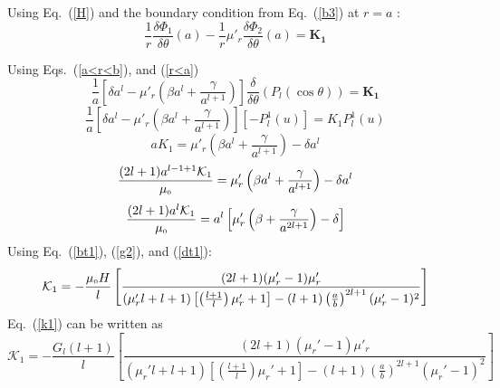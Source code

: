 Using Eq.~(\ref{H}) and the boundary condition from Eq.~(\ref{b3}) at $r=a$ :
$$\frac{1}{r}\frac{\delta \Phi_1}{\delta \theta}(a)-\frac{1}{r}\mu'_r\frac{\delta \Phi_2}{\delta \theta}(a)=\bm{K_1}  $$

Using Eqs.~(\ref{a<r<b}), and (\ref{r<a})
$$\frac{1}{a}\left[\delta a^l-\mu'_r\left(\beta a^l+\frac{\gamma}{a^{l+1}}\right)\right]\frac{\delta}{\delta \theta}(P_l(\cos\theta))= \bm{K_1}$$
$$\frac{1}{a}\left[\delta a^l-\mu'_r\left(\beta a^l+\frac{\gamma}{a^{l+1}}\right)\right][-P_l^1(u)]= K_1 P_l^1(u)$$
$$a K_1=\mu'_r\left(\beta a^l+\frac{\gamma}{a^{l+1}}\right)-\delta a^l$$
$$\frac{(2l+1)a^{l-1+1}\mathcal{K}_1}{\mu_{\scriptscriptstyle 0}}=\mu'_r\left(\beta a^l+\frac{\gamma}{a^{l+1}}\right)-\delta a^l$$
$$\frac{(2l+1)a^l\mathcal{K}_1}{\mu_{\scriptscriptstyle 0}}=a^l\left[\mu'_r\left(\beta +\frac{\gamma}{a^{2l+1}}\right)-\delta \right]$$
Using Eq.~(\ref{bt1}), (\ref{g2}), and (\ref{dt1}):
\begin{equation}\label{k1s}
\mathcal{K}_1=-\frac{\mu_{\scriptscriptstyle 0} H}{l}\left[\frac{(2l+1)(\mu_r'-1)\mu'_r}{(\mu_r'l+l+1)\left[\left(\frac{l+1}{l}\right)\mu_r'+1\right]-(l+1)\left(\frac{a}{b}\right)^{2l+1}(\mu_r'-1)^2}\right]
\end{equation}
Eq.~(\ref{k1}) can be written as
\begin{equation}\label{k1b}
\mathcal{K}_1=-\frac{G_l (l+1)}{l}\left[\frac{(2l+1)(\mu_r'-1)\mu'_r}{(\mu_r'l+l+1)\left[\left(\frac{l+1}{l}\right)\mu_r'+1\right]-(l+1)\left(\frac{a}{b}\right)^{2l+1}(\mu_r'-1)^2}\right]
\end{equation}

